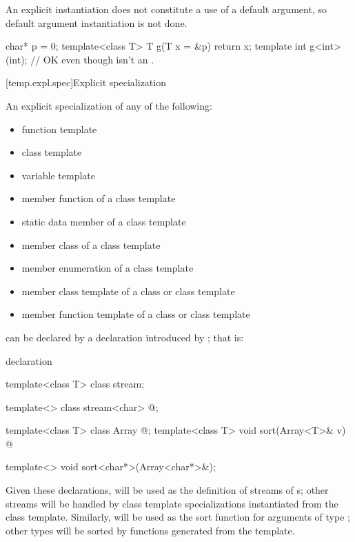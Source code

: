 \pnum
An explicit instantiation does not constitute a use of a default argument,
so default argument instantiation is not done.
\begin{example}

\begin{codeblock}
char* p = 0;
template<class T> T g(T x = &p) { return x; }
template int g<int>(int);       // OK even though  isn't an .
\end{codeblock}
\end{example}

[temp.expl.spec]{Explicit specialization}

\pnum
{}%
An explicit specialization of any of the following:

\begin{itemize}
\item
function template
\item
class template
\item
variable template
\item
member function of a class template
\item
static data member of a class template
\item
member class of a class template
\item
member enumeration of a class template
\item
member class template of a class or class template
\item
member function template of a class or class template
\end{itemize}

can be declared by a declaration introduced by
;
that is:
%

\begin{bnf}
\br
   \terminal{<} \terminal{>} declaration
\end{bnf}

\begin{example}
\begin{codeblock}
template<class T> class stream;

template<> class stream<char> { @\commentellip@ };

template<class T> class Array { @\commentellip@ };
template<class T> void sort(Array<T>& v) { @\commentellip@ }

template<> void sort<char*>(Array<char*>&);
\end{codeblock}

Given these declarations,
will be used as the definition of streams of
s;
other streams will be handled by class template specializations instantiated
from the class template.
Similarly,
will be used as the sort function for arguments
of type
;
other
types will be sorted by functions generated from the template.
\end{example}

